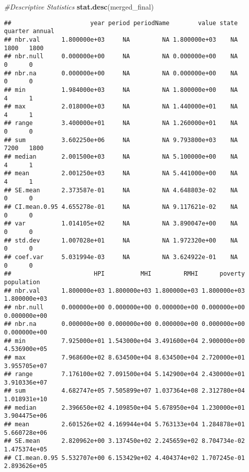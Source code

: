 \documentclass[
]{article}
\newenvironment{Shaded}{\begin{snugshade}}{\end{snugshade}}
\newcommand{\CommentTok}[1]{\textcolor[rgb]{0.56,0.35,0.01}{\textit{#1}}}
\newcommand{\KeywordTok}[1]{\textcolor[rgb]{0.13,0.29,0.53}{\textbf{#1}}}
\newcommand{\NormalTok}[1]{#1}
\begin{document}
\begin{Shaded}
\begin{Highlighting}[]
\CommentTok{#Descriptive Statistics}
\KeywordTok{stat.desc}\NormalTok{(merged_final)}
\end{Highlighting}
\end{Shaded}

\begin{verbatim}
##                      year period periodName        value state quarter annual
## nbr.val      1.800000e+03     NA         NA 1.800000e+03    NA    1800   1800
## nbr.null     0.000000e+00     NA         NA 0.000000e+00    NA       0      0
## nbr.na       0.000000e+00     NA         NA 0.000000e+00    NA       0      0
## min          1.984000e+03     NA         NA 1.800000e+00    NA       4      1
## max          2.018000e+03     NA         NA 1.440000e+01    NA       4      1
## range        3.400000e+01     NA         NA 1.260000e+01    NA       0      0
## sum          3.602250e+06     NA         NA 9.793800e+03    NA    7200   1800
## median       2.001500e+03     NA         NA 5.100000e+00    NA       4      1
## mean         2.001250e+03     NA         NA 5.441000e+00    NA       4      1
## SE.mean      2.373587e-01     NA         NA 4.648803e-02    NA       0      0
## CI.mean.0.95 4.655278e-01     NA         NA 9.117621e-02    NA       0      0
## var          1.014105e+02     NA         NA 3.890047e+00    NA       0      0
## std.dev      1.007028e+01     NA         NA 1.972320e+00    NA       0      0
## coef.var     5.031994e-03     NA         NA 3.624922e-01    NA       0      0
##                       HPI          MHI         RMHI      poverty   population
## nbr.val      1.800000e+03 1.800000e+03 1.800000e+03 1.800000e+03 1.800000e+03
## nbr.null     0.000000e+00 0.000000e+00 0.000000e+00 0.000000e+00 0.000000e+00
## nbr.na       0.000000e+00 0.000000e+00 0.000000e+00 0.000000e+00 0.000000e+00
## min          7.925000e+01 1.543000e+04 3.491600e+04 2.900000e+00 4.536900e+05
## max          7.968600e+02 8.634500e+04 8.634500e+04 2.720000e+01 3.955705e+07
## range        7.176100e+02 7.091500e+04 5.142900e+04 2.430000e+01 3.910336e+07
## sum          4.682747e+05 7.505899e+07 1.037364e+08 2.312780e+04 1.018931e+10
## median       2.396650e+02 4.109850e+04 5.678950e+04 1.230000e+01 3.904475e+06
## mean         2.601526e+02 4.169944e+04 5.763133e+04 1.284878e+01 5.660728e+06
## SE.mean      2.820962e+00 3.137450e+02 2.245659e+02 8.704734e-02 1.475374e+05
## CI.mean.0.95 5.532707e+00 6.153429e+02 4.404374e+02 1.707245e-01 2.893626e+05

\end{verbatim}
\end{document}
